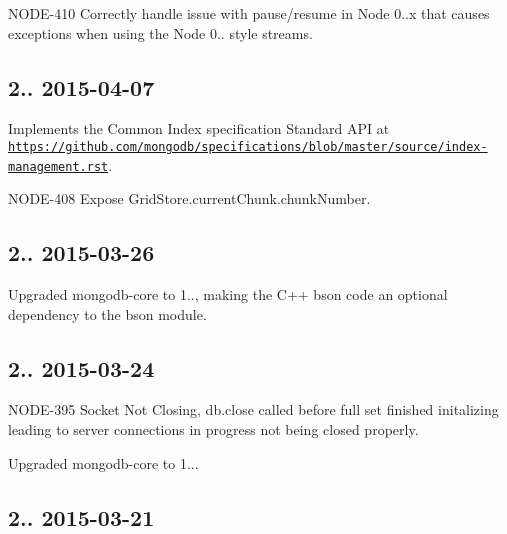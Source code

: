 \begin{DoxyItemize}
\item N\+O\+D\+E-\/410 Correctly handle issue with pause/resume in Node 0..\+x that causes exceptions when using the Node 0.. style streams.
\end{DoxyItemize}

\subsection*{2.. 2015-\/04-\/07 }


\begin{DoxyItemize}
\item Implements the Common Index specification Standard A\+PI at \href{https://github.com/mongodb/specifications/blob/master/source/index-management.rst}{\tt https\+://github.\+com/mongodb/specifications/blob/master/source/index-\/management.\+rst}.
\item N\+O\+D\+E-\/408 Expose Grid\+Store.\+current\+Chunk.\+chunk\+Number.
\end{DoxyItemize}

\subsection*{2.. 2015-\/03-\/26 }


\begin{DoxyItemize}
\item Upgraded mongodb-\/core to 1.., making the C++ bson code an optional dependency to the bson module.
\end{DoxyItemize}

\subsection*{2.. 2015-\/03-\/24 }


\begin{DoxyItemize}
\item N\+O\+D\+E-\/395 Socket Not Closing, db.\+close called before full set finished initalizing leading to server connections in progress not being closed properly.
\item Upgraded mongodb-\/core to 1...
\end{DoxyItemize}

\subsection*{2.. 2015-\/03-\/21 }


